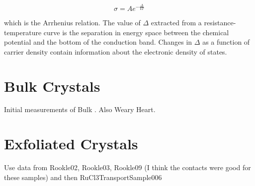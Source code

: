 \begin{equation}
\sigma = A e^{-\frac{\Delta}{kT}}
\end{equation}

which is the Arrhenius relation. The value of $\Delta$ extracted from a resistance-temperature curve is the separation in energy space between the chemical potential and the bottom of the conduction band. Changes in $\Delta$ as a function of carrier density contain information about the electronic density of states.


\section{\texorpdfstring{\rucl}{RuCl3} Bulk Crystals}

Initial measurements of Bulk \ruclnospace . Also Weary Heart.

\section{Exfoliated \texorpdfstring{\rucl}{RuCl3} Crystals}

Use data from Rookle02, Rookle03, Rookle09 (I think the contacts were good for these samples) and then RuCl3TransportSample006
